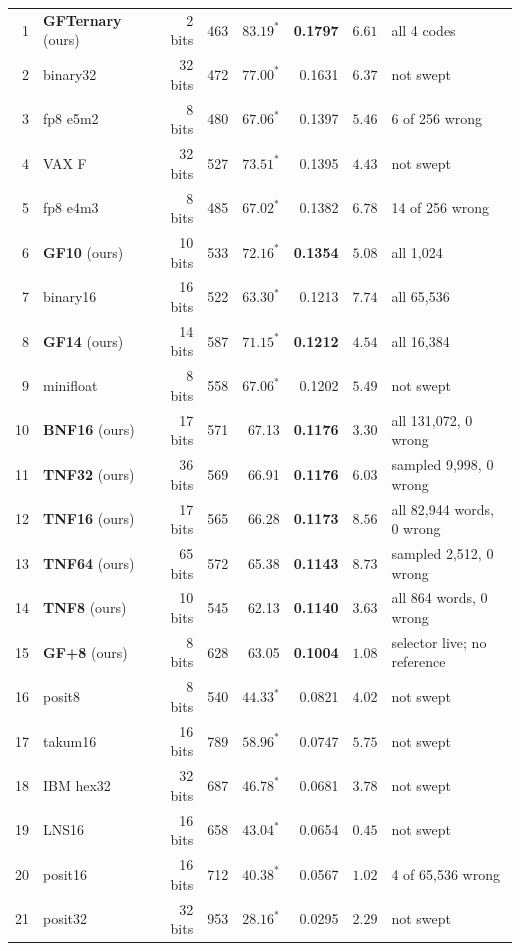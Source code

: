 \begin{table}[t]
\begin{tabular}{rlrrrrrl}
\midrule
1 & \textbf{GFTernary} (ours) & 2 bits & 463 & $83.19^{\ast}$ & \textbf{0.1797} & $6.61$ & all 4 codes \\
2 & binary32 & 32 bits & 472 & $77.00^{\ast}$ & 0.1631 & $6.37$ & not swept \\
3 & fp8 e5m2 & 8 bits & 480 & $67.06^{\ast}$ & 0.1397 & $5.46$ & 6 of 256 wrong \\
4 & VAX F & 32 bits & 527 & $73.51^{\ast}$ & 0.1395 & $4.43$ & not swept \\
5 & fp8 e4m3 & 8 bits & 485 & $67.02^{\ast}$ & 0.1382 & $6.78$ & 14 of 256 wrong \\
6 & \textbf{GF10} (ours) & 10 bits & 533 & $72.16^{\ast}$ & \textbf{0.1354} & $5.08$ & all 1{,}024 \\
7 & binary16 & 16 bits & 522 & $63.30^{\ast}$ & 0.1213 & $7.74$ & all 65{,}536 \\
8 & \textbf{GF14} (ours) & 14 bits & 587 & $71.15^{\ast}$ & \textbf{0.1212} & $4.54$ & all 16{,}384 \\
9 & minifloat & 8 bits & 558 & $67.06^{\ast}$ & 0.1202 & $5.49$ & not swept \\
10 & \textbf{BNF16} (ours) & 17 bits & 571 & 67.13 & \textbf{0.1176} & $3.30$ & all 131{,}072, 0 wrong \\
11 & \textbf{TNF32} (ours) & 36 bits & 569 & 66.91 & \textbf{0.1176} & $6.03$ & sampled 9{,}998, 0 wrong \\
12 & \textbf{TNF16} (ours) & 17 bits & 565 & 66.28 & \textbf{0.1173} & $8.56$ & all 82{,}944 words, 0 wrong \\
13 & \textbf{TNF64} (ours) & 65 bits & 572 & 65.38 & \textbf{0.1143} & $8.73$ & sampled 2{,}512, 0 wrong \\
14 & \textbf{TNF8} (ours) & 10 bits & 545 & 62.13 & \textbf{0.1140} & $3.63$ & all 864 words, 0 wrong \\
15 & \textbf{GF+8} (ours) & 8 bits & 628 & 63.05 & \textbf{0.1004} & $1.08$ & selector live; no reference \\
16 & posit8 & 8 bits & 540 & $44.33^{\ast}$ & 0.0821 & $4.02$ & not swept \\
17 & takum16 & 16 bits & 789 & $58.96^{\ast}$ & 0.0747 & $5.75$ & not swept \\
18 & IBM hex32 & 32 bits & 687 & $46.78^{\ast}$ & 0.0681 & $3.78$ & not swept \\
19 & LNS16 & 16 bits & 658 & $43.04^{\ast}$ & 0.0654 & $0.45$ & not swept \\
20 & posit16 & 16 bits & 712 & $40.38^{\ast}$ & 0.0567 & $1.02$ & 4 of 65{,}536 wrong \\
21 & posit32 & 32 bits & 953 & $28.16^{\ast}$ & 0.0295 & $2.29$ & not swept \\
\bottomrule
\end{tabular}
\end{table}

